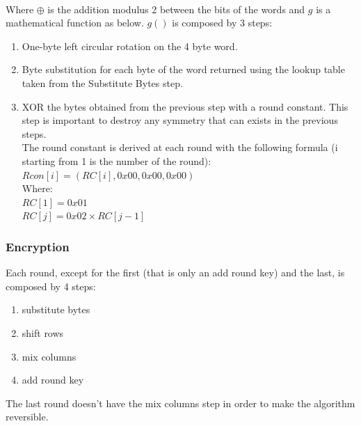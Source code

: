 \\Where $\oplus$ is the addition modulus 2 between the bits of the words and $g$ is a mathematical function as below.
$g()$ is composed by 3 steps: 
\begin{enumerate}
	\item One-byte left circular rotation on the 4 byte word.
	\item Byte substitution for each byte of the word returned using the lookup table taken from the Substitute Bytes step.
	\item XOR the bytes obtained from the previous step with a round constant. This step is important to destroy any symmetry that can exists in the previous steps.\\
	The round constant is derived at each round with the following formula (i starting from 1 is the number of the round):\\
	$Rcon[i] = (RC[i], 0x00, 0x00, 0x00)$\\
	Where:\\
	$RC[1] = 0x01$\\
	$RC[j] = 0x02 \times RC[j-1]$
\end{enumerate}


\subsubsection{Encryption}
Each round, except for the first (that is only an add round key) and the last, is composed by 4 steps:
\begin{enumerate}
\item substitute bytes
\item shift rows
\item mix columns
\item add round key
\end{enumerate}

The last round doesn't have the mix columns step in order to make the algorithm reversible. 
